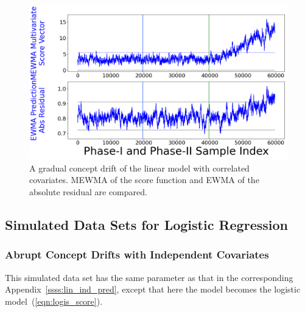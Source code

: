 \documentclass[twoside,11pt]{article}
\begin{document}
\begin{appendices}
\begin{figure}[!htbp]
\centering
\includegraphics[width = 0.8\linewidth]{../figures/v14/sim_6/reg/1_sim6_lin_1e-08_0_005_1.png}
  \caption{A gradual concept drift of the linear model with correlated covariates. MEWMA of the score function and EWMA of the absolute residual are compared.}
  \label{fig:lin_reg_ind_X_grad_cd_comp}
\end{figure}

\subsection{Simulated Data Sets for Logistic Regression}
\label{sss:logi_exp}

\subsubsection{Abrupt Concept Drifts with Independent Covariates}
\label{ssss:log_ind_pred}
This simulated data set has the same parameter as that in the corresponding Appendix~\ref{ssss:lin_ind_pred}, except that here the model becomes the logistic model~(\ref{eqn:logis_score}).


\end{appendices}
\end{document}
